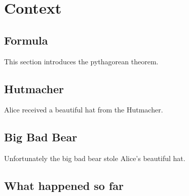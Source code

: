 \chapter{Context}




\section{Formula}

This section introduces the pythagorean theorem.


\section{Hutmacher}

Alice received a beautiful hat from the Hutmacher.


\section{Big Bad Bear}

Unfortunately the big bad bear stole Alice's beautiful hat.


%
%

\section{What happened so far}

\contextPrintAll
